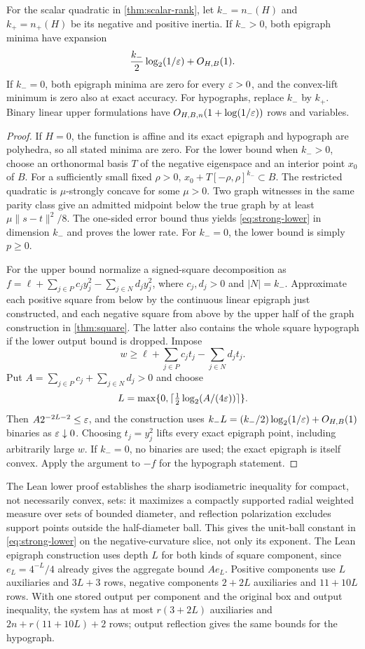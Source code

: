 \begin{theorem}\label{thm:inertia}
For the scalar quadratic in \cref{thm:scalar-rank}, let
$k_-=n_-(H)$ and $k_+=n_+(H)$ be its negative and positive inertia.
If $k_->0$, both epigraph minima have expansion
\[
 \frac{k_-}{2}\log_2(1/\varepsilon)+O_{H,B}(1).
\]
If $k_-=0$, both epigraph minima are zero for every $\varepsilon>0$, and the
convex-lift minimum is zero also at exact accuracy. For hypographs,
replace $k_-$ by $k_+$. Binary linear upper formulations have
$O_{H,B,n}(1+\log(1/\varepsilon))$ rows and variables.
\end{theorem}
\begin{proof}
If $H=0$, the function is affine and its exact epigraph and hypograph
are polyhedra, so all stated minima are zero. For the lower bound when
$k_->0$, choose an orthonormal basis $T$ of the negative eigenspace and an
interior point $x_0$ of $B$. For a sufficiently small fixed $\rho>0$,
$x_0+T[-\rho,\rho]^{k_-}\subset B$. The restricted quadratic is
$\mu$-strongly concave for some $\mu>0$. Two graph witnesses in the
same parity class give an admitted midpoint below the true graph by
at least $\mu\|s-t\|^2/8$. The one-sided error bound thus yields
\eqref{eq:strong-lower} in dimension $k_-$ and proves the lower rate.
For $k_-=0$, the lower bound is simply $p\ge0$.

For the upper bound normalize a signed-square decomposition as
$f=\ell+\sum_{j\in P}c_jy_j^2-\sum_{j\in N}d_jy_j^2$,
where $c_j,d_j>0$ and $|N|=k_-$. Approximate each positive square
from below by the continuous linear epigraph just constructed, and
each negative square from above by the upper half of the graph
construction in \cref{thm:square}. The latter also contains the whole
square hypograph if the lower output bound is dropped. Impose
\[
 w\ge\ell+\sum_{j\in P}c_jt_j-\sum_{j\in N}d_jt_j.
\]
Put $A=\sum_{j\in P}c_j+\sum_{j\in N}d_j>0$ and choose
\[
 L=\max\{0,\lceil\tfrac12\log_2(A/(4\varepsilon))\rceil\}.
\]
Then $A2^{-2L-2}\le\varepsilon$, and the construction uses
$k_-L=(k_-/2)\log_2(1/\varepsilon)+O_{H,B}(1)$ binaries as
$\varepsilon\downarrow0$. Choosing $t_j=y_j^2$ lifts every exact epigraph
point, including arbitrarily large $w$. If $k_-=0$, no binaries are
used; the exact epigraph is itself convex. Apply the argument to $-f$
for the hypograph statement.
\end{proof}

The Lean lower proof establishes the sharp isodiametric inequality for
compact, not necessarily convex, sets: it maximizes a compactly supported
radial weighted measure over sets of bounded diameter, and reflection
polarization excludes support points outside the half-diameter ball.
This gives the unit-ball constant in \eqref{eq:strong-lower} on the
negative-curvature slice, not only its exponent. The Lean epigraph
construction uses depth $L$ for both kinds of square component, since
$e_L=4^{-L}/4$ already gives the aggregate bound $Ae_L$. Positive
components use $L$ auxiliaries and $3L+3$ rows, negative components
$2+2L$ auxiliaries and $11+10L$ rows. With one stored output per
component and the original box and output inequality, the system has at
most $r(3+2L)$ auxiliaries and $2n+r(11+10L)+2$ rows; output reflection
gives the same bounds for the hypograph.

